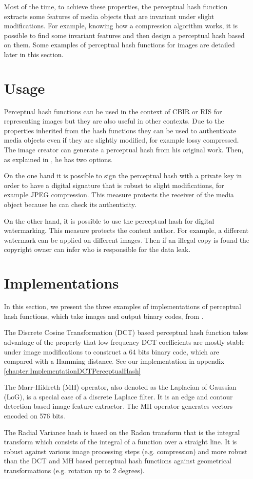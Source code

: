 Most of the time, to achieve these properties, the perceptual hash function extracts some features of media objects that are invariant under slight modifications. For example, knowing how a compression algorithm works, it is possible to find some invariant features and then design a perceptual hash based on them. Some examples of perceptual hash functions for images are detailed later in this section.

\section{Usage}
Perceptual hash functions can be used in the context of CBIR or RIS for representing images but they are also useful in other contexts. Due to the properties inherited from the hash functions they can be used to authenticate media objects even if they are slightly modified, for example lossy compressed. The image creator can generate a perceptual hash from his original work. Then, as explained in \cite{zauner2010implementation}, he has two options. 

On the one hand it is possible to sign the perceptual hash with a private key in order to have a digital signature that is robust to slight modifications, for example JPEG compression. This measure protects the receiver of the media object because he can check its authenticity.

On the other hand, it is possible to use the perceptual hash for digital watermarking. This measure protects the content author. For example, a different watermark can be applied on different images. Then if an illegal copy is found the copyright owner can infer who is responsible for the data leak. 

\section{Implementations}
In this section, we present the three examples of implementations of perceptual hash functions, which take images and output binary codes, from \cite{zauner2010implementation}.

The Discrete Cosine Transformation (DCT) based perceptual hash function takes advantage of the property that low-frequency DCT coefficients are mostly stable under image modifications to construct a 64 bits binary code, which are compared with a Hamming distance. See our implementation in appendix \ref{chapter:ImplementationDCTPerceptualHash}

The Marr-Hildreth (MH) operator, also denoted as the Laplacian of Gaussian (LoG), is a special case of a discrete Laplace filter. It is an edge and contour detection based image feature extractor. The MH operator generates vectors encoded on 576 bits.

The Radial Variance hash is based on the Radon transform that is the integral transform which consists of the integral of a function over a straight line. It is robust against various image processing steps (e.g. compression) and more robust than the DCT and MH based perceptual hash functions against geometrical transformations (e.g. rotation up to 2 degrees).
